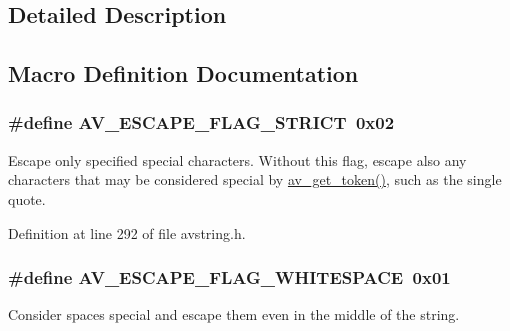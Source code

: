 \subsection{Detailed Description}


\subsection{Macro Definition Documentation}
\subsubsection[{\texorpdfstring{A\+V\+\_\+\+E\+S\+C\+A\+P\+E\+\_\+\+F\+L\+A\+G\+\_\+\+S\+T\+R\+I\+CT}{AV_ESCAPE_FLAG_STRICT}}]{\setlength{\rightskip}{0pt plus 5cm}\#define A\+V\+\_\+\+E\+S\+C\+A\+P\+E\+\_\+\+F\+L\+A\+G\+\_\+\+S\+T\+R\+I\+CT~0x02}\hypertarget{group__lavu__string_ga24963cc06a1b89194ba8a2fe013a7d7d}{}\label{group__lavu__string_ga24963cc06a1b89194ba8a2fe013a7d7d}
Escape only specified special characters. Without this flag, escape also any characters that may be considered special by \hyperlink{group__lavu__string_ga7b438169b430f6edf4f4451d867a9218}{av\+\_\+get\+\_\+token()}, such as the single quote. 

Definition at line 292 of file avstring.\+h.

\subsubsection[{\texorpdfstring{A\+V\+\_\+\+E\+S\+C\+A\+P\+E\+\_\+\+F\+L\+A\+G\+\_\+\+W\+H\+I\+T\+E\+S\+P\+A\+CE}{AV_ESCAPE_FLAG_WHITESPACE}}]{\setlength{\rightskip}{0pt plus 5cm}\#define A\+V\+\_\+\+E\+S\+C\+A\+P\+E\+\_\+\+F\+L\+A\+G\+\_\+\+W\+H\+I\+T\+E\+S\+P\+A\+CE~0x01}\hypertarget{group__lavu__string_ga84ac09ffcff9c3c42c35db1f8477cc17}{}\label{group__lavu__string_ga84ac09ffcff9c3c42c35db1f8477cc17}
Consider spaces special and escape them even in the middle of the string.

